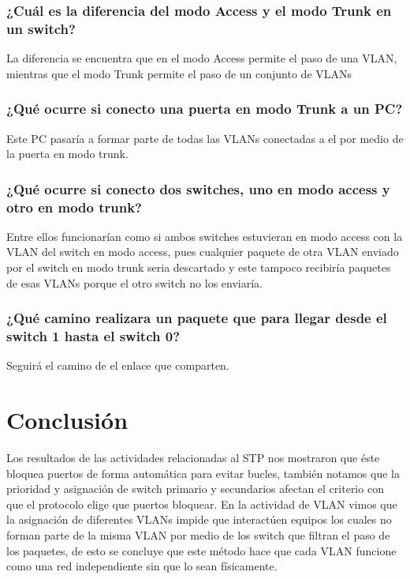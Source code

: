 \documentclass[spanish]{udpreport}
\begin{document}
\subsection{¿Cuál es la diferencia del modo Access y el modo Trunk en un switch?}
La diferencia se encuentra que en el modo Access permite el paso de una VLAN, mientras que el modo Trunk permite el paso de un conjunto de VLANs

\subsection{¿Qué ocurre si conecto una puerta en modo Trunk a un PC?}
Este PC pasaría a formar parte de todas las VLANs conectadas a el por medio de la puerta en modo trunk.

\subsection{¿Qué ocurre si conecto dos switches, uno en modo access y otro en modo trunk?}
Entre ellos funcionarían como si ambos switches estuvieran en modo access con la VLAN del switch en modo access, pues cualquier paquete de otra VLAN enviado por el switch en modo trunk seria descartado y este tampoco recibiría paquetes de esas VLANs porque el otro switch no los enviaría.

\subsection{¿Qué camino realizara un paquete que para llegar desde el switch 1 hasta el switch 0?}

Seguirá el camino de el enlace que comparten.

\chapter{Conclusión}
Los resultados de las actividades relacionadas al STP nos mostraron que éste bloquea puertos de forma automática para evitar bucles, también notamos que la prioridad y asignación de switch primario y secundarios afectan el criterio con que el protocolo elige que puertos bloquear. En la actividad de VLAN vimos que la asignación de diferentes VLANs impide que interactúen equipos los cuales no forman parte de la misma VLAN por medio de los switch que filtran el paso de los paquetes, de esto se concluye que este método hace que cada VLAN funcione como una red independiente sin que lo sean físicamente.

\listoffigures
\end{document}
